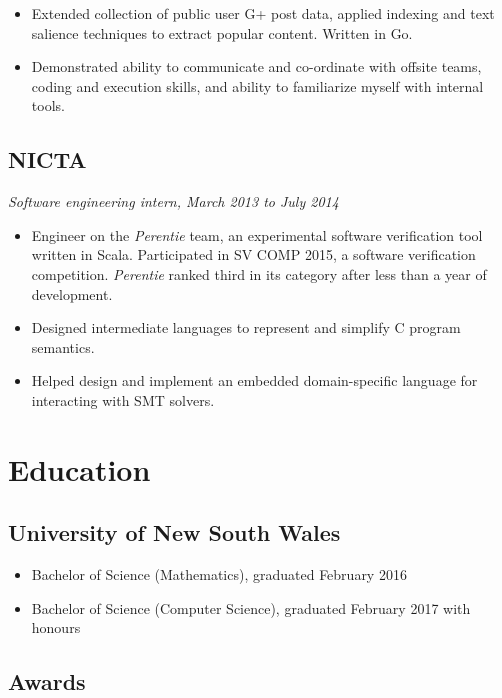 \documentclass{article}
\begin{document}
\begin{multicols*}{2}
\begin{itemize}[leftmargin=12pt, itemsep=-2pt, topsep=-4pt]
 \item {
  Extended collection of public user G+ post data, applied indexing and text salience techniques to extract popular content. Written in Go.
 }
 \item {
  Demonstrated ability to communicate and co-ordinate with offsite teams, coding and execution skills, and ability to familiarize myself with internal tools.
 }
\end{itemize}

\subsection*{NICTA}
\textit{Software engineering intern, March 2013 to July 2014}

\begin{itemize}[leftmargin=12pt, itemsep=-2pt, topsep=-4pt]
 \item {
  Engineer on the \textit{Perentie} team, an experimental software verification tool written in Scala. Participated in SV COMP 2015, a software verification competition. \textit{Perentie} ranked third in its category after less than a year of development.
 }
 \item {
  Designed intermediate languages to represent and simplify C program semantics.
 }
 \item {
  Helped design and implement an embedded domain-specific language for interacting with SMT solvers.
 }
\end{itemize}

\section*{Education}

\subsection*{University of New South Wales}
\begin{itemize}[leftmargin=12pt, itemsep=-2pt]
 \item {Bachelor of Science (Mathematics), graduated February 2016}
 \item {Bachelor of Science (Computer Science), graduated February 2017 with honours}
\end{itemize}

\subsection*{Awards}


\end{multicols*}
\end{document}
